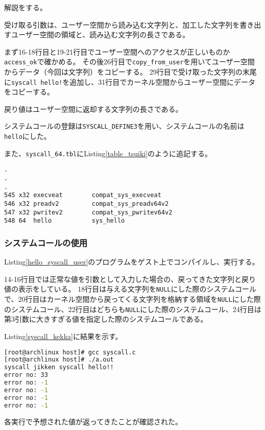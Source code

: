 \documentclass[main]{subfiles}
\begin{document}
解説をする。

受け取る引数は、ユーザー空間から読み込む文字列と、加工した文字列を書き出すユーザー空間の領域と、読み込む文字列の長さである。

まず16-18行目と19-21行目でユーザー空間へのアクセスが正しいものか\texttt{access\_ok}で確かめる。
その後26行目で\texttt{copy\_from\_user}を用いてユーザー空間からデータ（今回は文字列）をコピーする。
29行目で受け取った文字列の末尾に\texttt{syscall hello!}を追加し、31行目でカーネル空間からユーザー空間にデータをコピーする。

戻り値はユーザー空間に返却する文字列の長さである。

システムコールの登録は\texttt{SYSCALL\_DEFINE3}を用い、システムコールの名前は\texttt{hello}にした。

また、\texttt{syscall\_64.tbl}にListing\ref{table_tsuiki}のように追記する。

\begin{lstlisting}[label=table_tsuiki,caption=\texttt{syscall\_64.tbl}に追加する]
.
.
.
545	x32	execveat		compat_sys_execveat
546	x32	preadv2			compat_sys_preadv64v2
547	x32	pwritev2		compat_sys_pwritev64v2
548 64  hello           sys_hello
\end{lstlisting}

\subsubsection{システムコールの使用}

Listing\ref{hello_syscall_user}のプログラムをゲスト上でコンパイルし、実行する。



14-16行目では正常な値を引数として入力した場合の、戻ってきた文字列と戻り値の表示をしている。
18行目は与える文字列を\texttt{NULL}にした際のシステムコールで、20行目はカーネル空間から戻ってくる文字列を格納する領域を\texttt{NULL}にした際のシステムコール、22行目はどちらも\texttt{NULL}にした際のシステムコール、24行目は第3引数に大きすぎる値を指定した際のシステムコールである。

Listing\ref{syscall_kekka}に結果を示す。

\begin{lstlisting}[label=syscall_kekka,caption=システムコールの実行結果,language=sh]
[root@archlinux host]# gcc syscall.c
[root@archlinux host]# ./a.out
syscall jikken syscall hello!!
error no: 33
error no: -1
error no: -1
error no: -1
error no: -1
\end{lstlisting}

各実行で予想された値が返ってきたことが確認された。
\end{document}
